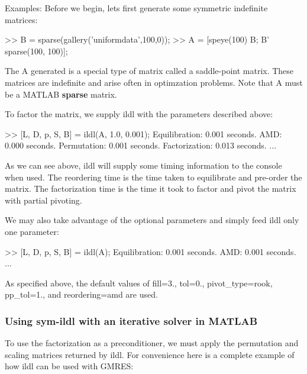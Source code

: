 \begin{DoxyParagraph}{Examples\+:}
Before we begin, let\textquotesingle{}s first generate some symmetric indefinite matrices\+: 
\begin{DoxyCode}
>> B = sparse(gallery(\textcolor{stringliteral}{'uniformdata'},100,0));
>> A = [speye(100) B; B' sparse(100, 100)];
\end{DoxyCode}
 The {\ttfamily A} generated is a special type of matrix called a saddle-\/point matrix. These matrices are indefinite and arise often in optimzation problems. Note that A must be a M\+A\+T\+L\+AB {\bfseries sparse} matrix.
\end{DoxyParagraph}
\begin{DoxyParagraph}{}
To factor the matrix, we supply {\ttfamily ildl} with the parameters described above\+: 
\begin{DoxyCode}
>> [L, D, p, S, B] = ildl(A, 1.0, 0.001);
Equilibration:  0.001 seconds.
AMD:            0.000 seconds.
Permutation:    0.001 seconds.
Factorization:  0.013 seconds.
...
\end{DoxyCode}
 As we can see above, {\ttfamily ildl} will supply some timing information to the console when used. The reordering time is the time taken to equilibrate and pre-\/order the matrix. The factorization time is the time it took to factor and pivot the matrix with partial pivoting.
\end{DoxyParagraph}
\begin{DoxyParagraph}{}
We may also take advantage of the optional parameters and simply feed {\ttfamily ildl} only one parameter\+: 
\begin{DoxyCode}
>> [L, D, p, S, B] = ildl(A);
Equilibration:  0.001 seconds.
AMD:        0.001 seconds.
...
\end{DoxyCode}
 As specified above, the default values of {\ttfamily fill=3.}, {\ttfamily tol=0.}, {\ttfamily pivot\+\_\+type=\textquotesingle{}rook\textquotesingle{}}, {\ttfamily pp\+\_\+tol=1.}, and {\ttfamily reordering=amd} are used.
\end{DoxyParagraph}
\hypertarget{index_gmres_ildl}{}\subsubsection{Using sym-\/ildl with an iterative solver in M\+A\+T\+L\+AB}\label{index_gmres_ildl}
To use the factorization as a preconditioner, we must apply the permutation and scaling matrices returned by {\ttfamily ildl}. For convenience here is a complete example of how {\ttfamily ildl} can be used with G\+M\+R\+ES\+:

